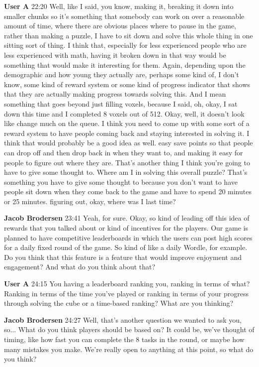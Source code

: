 \documentclass{article}
\begin{document}
\noindent \textbf{User A}   22:20
Well, like I said, you know, making it, breaking it down into smaller chunks so it's something that somebody can work on over a reasonable amount of time, where there are obvious places where to pause in the game, rather than making a puzzle, I have to sit down and solve this whole thing in one sitting sort of thing. I think that, especially for less experienced
people who are less experienced with math, having it broken down in that way would be something that would make it interesting for them. Again, depending upon the demographic and how young they actually are, perhaps some kind of, I don't know, some kind of reward system or some kind of progress indicator that shows that they are actually making progress towards solving this.
And I mean something that goes beyond just filling voxels, because I said, oh, okay, I sat down this time and I completed 8 voxels out of 512. Okay, well, it doesn't look like change much on the queue. I think you need to come up with some sort of a reward system to have people coming back and staying interested in solving it. I think that would probably be a good idea as well.
easy save points so that people can drop off and then drop back in when they want to, and making it easy for people to figure out where they are. That's another thing I think you're going to have to give some thought to. Where am I in solving this overall puzzle? That's something you have to give some thought to because you don't want to have people sit down when they come back to the game and have to spend 20 minutes or 25 minutes.
figuring out, okay, where was I last time?

\noindent \textbf{Jacob Brodersen}   23:41
Yeah, for sure.
Okay, so kind of leading off this idea of rewards that you talked about or kind of incentives for the players. Our game is planned to have competitive leaderboards in which the users can post high scores for a daily fixed round of the game. So kind of like a daily
Wordle, for example.
Do you think that this feature is a feature that would improve enjoyment and engagement? And what do you think about that?

\noindent \textbf{User A}   24:15
You having a leaderboard ranking you, ranking in terms of what? Ranking in terms of the time you've played or ranking in terms of your progress through solving the cube or a time-based ranking? What are you thinking?

\noindent \textbf{Jacob Brodersen}   24:27
Well, that's another question we wanted to ask you, so...
What do you think players should be based on? It could be, we've thought of timing, like how fast you can complete the 8 tasks in the round, or maybe how many mistakes you make. We're really open to anything at this point, so what do you think?
\end{document}
